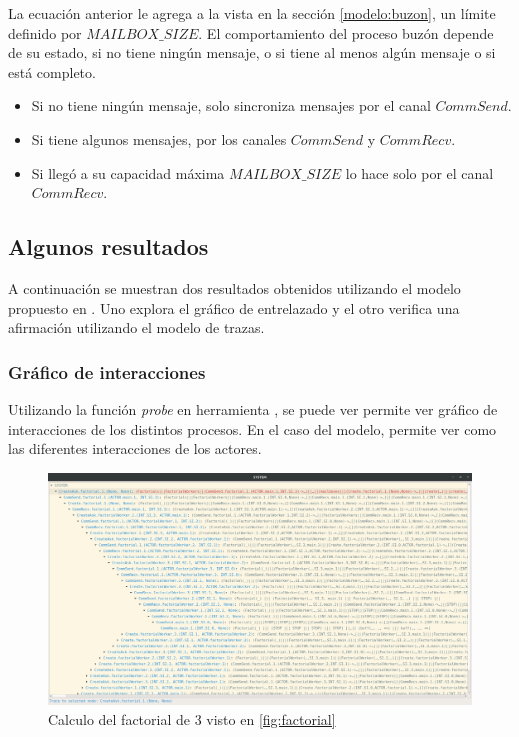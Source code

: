 La ecuación anterior le agrega a la vista en la sección \ref{modelo:buzon}, un límite definido por $MAILBOX\_SIZE$. El comportamiento del proceso buzón depende de su estado, si no tiene ningún mensaje, o si tiene al menos algún mensaje o si está completo.

\begin{itemize}
\item Si no tiene ningún mensaje, solo sincroniza mensajes por el canal $CommSend$.
\item Si tiene algunos mensajes, por los canales $CommSend$ y $CommRecv$.
\item Si llegó a su capacidad máxima $MAILBOX\_SIZE$ lo hace solo por el canal $CommRecv$.
\end{itemize}

\subsection{Algunos resultados}

A continuación se muestran dos resultados obtenidos utilizando el modelo propuesto en \CSP. Uno explora el gráfico de entrelazado y el otro verifica una afirmación utilizando el modelo de trazas.

\subsubsection*{Gráfico de interacciones}

Utilizando la función \textit{probe} en herramienta \FDR, se puede ver permite ver gráfico de interacciones de los distintos procesos. En el caso del modelo, permite ver como las diferentes interacciones de los actores.

\begin{figure}[H]

\begin{center}
\includegraphics[width=15 cm]{img/fact.png}
\caption{Calculo del factorial de 3 visto en \ref{fig:factorial}}\label{modelo:grafo}
\end{center}
\end{figure}

